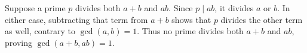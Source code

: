 Suppose a prime $p$ divides both $a+b$ and $ab$. Since $p\mid ab$, it divides $a$ or $b$. In either case, subtracting that term from $a+b$ shows that $p$ divides the other term as well, contrary to $\gcd(a,b)=1$. Thus no prime divides both $a+b$ and $ab$, proving $\boxed{\gcd(a+b,ab)=1}$.
